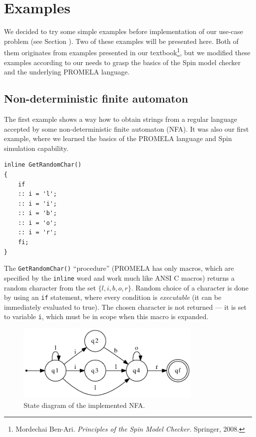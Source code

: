 
\section*{Examples}
\label{sec:examples}

We decided to try some simple examples before implementation of our use-case problem (see Section ). Two of these examples will be
presented here. Both of them originates from examples presented in our textbook\footnote{Mordechai Ben-Ari. \emph{Principles of the Spin Model Checker.} Springer, 2008.}, but we modified these examples according to our needs to grasp the basics of the Spin model checker and the underlying PROMELA language.

\subsection*{Non-deterministic finite automaton}

The first example shows a way how to obtain strings from a regular language accepted by some non-deterministic finite automaton (NFA). It was also our first example, where we learned the basics of the PROMELA language and Spin simulation capability.

\begin{lstlisting}[name=example1_listing]
inline GetRandomChar()
{
	if
	:: i = 'l';
	:: i = 'i';
	:: i = 'b';
	:: i = 'o';
	:: i = 'r';
	fi;
}
\end{lstlisting}

The \texttt{GetRandomChar()} ``procedure'' (PROMELA has only macros, which are specified by the \texttt{inline} word and work much like ANSI C macros) returns a random character from the set $\{l, i, b, o, r\}$. Random choice of a character is done by using an \texttt{if} statement, where every condition is \emph{executable} (it can be immediately evaluated to true). The chosen character is not returned --- it is set to variable \texttt{i}, which must be in scope when this macro is expanded.

\begin{figure}[h]
	\begin{center}
		\includegraphics[width=9cm,keepaspectratio]{include/nfa}
	\end{center}
	\caption{State diagram of the implemented NFA.}
	\label{fig:NFA}
\end{figure}

